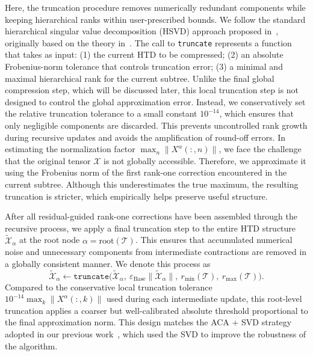 \documentclass{article}
\theoremstyle{plain}
\theoremstyle{definition}
\theoremstyle{remark}
\begin{document}
Here, the truncation procedure removes numerically redundant components while keeping hierarchical ranks within user-prescribed bounds. We follow the standard hierarchical singular value decomposition (HSVD) approach proposed in~\cite[Algorithm~6]{kressner2012htucker}, originally based on the theory in~\cite[Section~4]{grasedyck2010hierarchical}. The call to \texttt{truncate} represents a function that takes as input: (1) the current HTD to be compressed; (2) an absolute Frobenius-norm tolerance that controls truncation error; (3) a minimal and maximal hierarchical rank for the current subtree. Unlike the final global compression step, which will be discussed later, this local truncation step is not designed to control the global approximation error. Instead, we conservatively set the relative truncation tolerance to a small constant \(10^{-14}\), which ensures that only negligible components are discarded. This prevents uncontrolled rank growth during recursive updates and avoids the amplification of round-off errors. In estimating the normalization factor \(\max_n \| X^{\alpha}(:,n) \|\), we face the challenge that the original tensor \(\mathcal{X}\) is not globally accessible. Therefore, we approximate it using the Frobenius norm of the first rank-one correction encountered in the current subtree. Although this underestimates the true maximum, the resulting truncation is stricter, which empirically helps preserve useful structure.

After all residual-guided rank-one corrections have been assembled through the recursive process, we apply a final truncation step to the entire HTD structure \(\widetilde{\mathcal{X}}_{\alpha}\) at the root node $\alpha = \text{root}(\mathcal{T})$. This ensures that accumulated numerical noise and unnecessary components from intermediate contractions are removed in a globally consistent manner. We denote this process as
\begin{equation*}
    \widetilde{\mathcal{X}}_{\alpha} \gets \texttt{truncate}\Big(\widetilde{\mathcal{X}}_{\alpha}, ~\varepsilon_{\text{Base}}\|\widetilde{\mathcal{X}}_{\alpha}\|, ~r_{\min}(\mathcal{T}), ~r_{\max}(\mathcal{T})\Big).
\end{equation*}
Compared to the conservative local truncation tolerance \(10^{-14} \max_k \| X^{\alpha}(:,k) \|\) used during each intermediate update, this root-level truncation applies a coarser but well-calibrated absolute threshold proportional to the final approximation norm. This design matches the ACA + SVD strategy adopted in our previous work~\cite{zheng2025semi,sands2025adaptive}, which used the SVD to improve the robustness of the algorithm.
\end{document}
